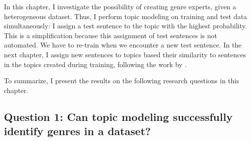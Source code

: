 In this chapter, I investigate the possibility of creating genre experts, given a heterogeneous dataset. Thus, I perform topic modeling on training and test data simultaneously: I assign a test sentence to the topic with the highest probability. %
This is a simplification because this assignment of test sentences is not automated. We have to re-train when we encounter a new test sentence. 
In the next chapter, I assign new sentences to topics based their similarity to sentences in the topics created during training, following the work by \citep{plank2011effective}. 

To summarize, I present the results on the following research questions in this chapter.

\subsection{Question 1: Can topic modeling successfully identify genres in a dataset?} \label{q1}


